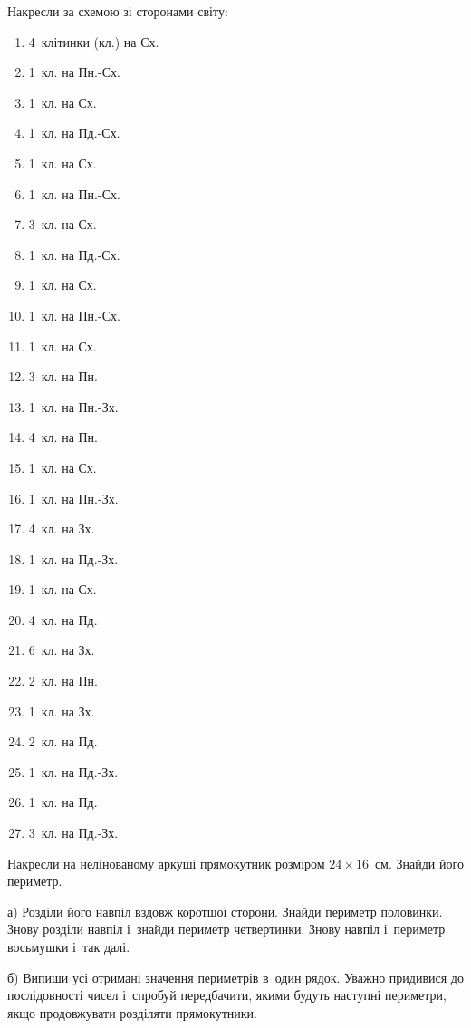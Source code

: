 \problem
Накресли за схемою зі сторонами світу:
\begin{multicols}{2}
    \begin{enumerate}
        \item 4~клітинки (кл.) на Сх.
        \item 1~кл. на Пн.-Сх.
        \item 1~кл. на Сх.
        \item 1~кл. на Пд.-Сх.
        \item 1~кл. на Сх.
        \item 1~кл. на Пн.-Сх.
        \item 3~кл. на Сх.
        \item 1~кл. на Пд.-Сх.
        \item 1~кл. на Сх.
        \item 1~кл. на Пн.-Сх.
        \item 1~кл. на Сх.
        \item 3~кл. на Пн.
        \item 1~кл. на Пн.-Зх.
        \item 4~кл. на Пн.
        \item 1~кл. на Сх.
        \item 1~кл. на Пн.-Зх.
        \item 4~кл. на Зх.
        \item 1~кл. на Пд.-Зх.
        \item 1~кл. на Сх.
        \item 4~кл. на Пд.
        \item 6~кл. на Зх.
        \item 2~кл. на Пн.
        \item 1~кл. на Зх.
        \item 2~кл. на Пд.
        \item 1~кл. на Пд.-Зх.
        \item 1~кл. на Пд.
        \item 3~кл. на Пд.-Зх.
    \end{enumerate}
\end{multicols}


\problem
Накресли на нелінованому аркуші прямокутник розміром $24\times16$~см.
Знайди його периметр.

а) Розділи його навпіл вздовж коротшої сторони.
Знайди периметр половинки.
Знову розділи навпіл і~знайди периметр четвертинки.
Знову навпіл і~периметр восьмушки і~так далі.

б) Випиши усі отримані значення периметрів в~один рядок.
Уважно придивися до послідовності чисел і~спробуй передбачити,
якими будуть наступні периметри, якщо продовжувати розділяти прямокутники.


